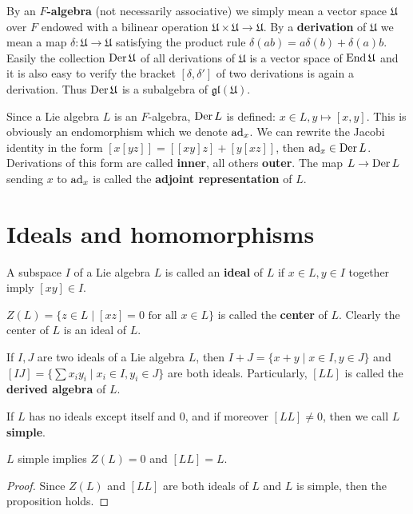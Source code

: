 \begin{definition}
    By an \textbf{$F$-algebra} (not necessarily associative) we simply mean a vector space $\mathfrak{U}$ over $F$ endowed with a bilinear operation $\mathfrak{U}\times \mathfrak{U}\to \mathfrak{U}$. By a \textbf{derivation} of $\mathfrak{U}$ we mean a map $\delta:\mathfrak{U} \to \mathfrak{U}$ satisfying the product rule $\delta(ab)=a\delta(b) +\delta(a)b$. Easily the collection $\operatorname{Der} \mathfrak{U}$ of all derivations of $\mathfrak{U}$ is a vector space of $\operatorname{End} \mathfrak{U}$ and it is also easy to verify the bracket $[\delta, \delta']$ of two derivations is again a derivation. Thus $\operatorname{Der} \mathfrak{U}$ is a subalgebra of $\mathfrak{gl} (\mathfrak{U})$.
\end{definition}

Since a Lie algebra $L$ is an $F$-algebra, $\operatorname{Der} L$ is defined: $x \in L, y\mapsto [x,y]$. This is obviously an endomorphism which we denote $\operatorname{ad}_x$. We can rewrite the Jacobi identity in the form $[x[yz]]=[[xy]z]+[y[xz]]$, then $\operatorname{ad}_x \in \operatorname{Der} L$. Derivations of this form are called \textbf{inner}, all others \textbf{outer}. The map $L\to \operatorname{Der} L$ sending $x$ to $\operatorname{ad}_x$ is called the \textbf{adjoint representation} of $L$.


\section{Ideals and homomorphisms}
\begin{definition}
    A subspace $I$ of a Lie algebra $L$ is called an \textbf{ideal} of $L$ if $x \in L, y \in I$ together imply $[xy] \in I$.
\end{definition}
$Z(L)=\{ z \in L \mid [xz]=0\text{ for all }x \in L  \}$ is called the \textbf{center} of $L$. Clearly the center of $L$ is an ideal of $L$.

If $I,J$ are two ideals of a Lie algebra $L$, then $I+J=\{ x+y \mid x \in I, y \in J \}$ and $[IJ]=\{ \sum x_{i}y_{i} \mid x_{i}\in I,y_{i} \in J  \}$ are both ideals. Particularly, $[LL]$ is called the \textbf{derived algebra} of $L$.

\begin{definition}
    If $L$ has no ideals except itself and 0, and if moreover $[LL]\neq 0$, then we call $L$ \textbf{simple}.
\end{definition}

\begin{proposition}
    $L$ simple implies $Z(L)=0$ and $[LL]=L$.
\end{proposition}
\begin{proof}
    Since $Z(L)$ and $[LL]$ are both ideals of $L$ and $L$ is simple, then the proposition holds.
\end{proof}

